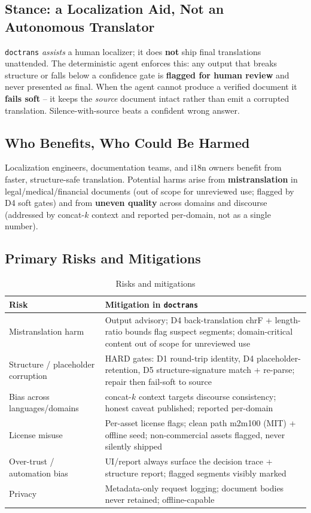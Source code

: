 \documentclass[12pt,a4paper]{article}
\begin{document}
\subsection{Stance: a Localization Aid, Not an Autonomous Translator}

\texttt{doctrans} \emph{assists} a human localizer; it does \textbf{not} ship final translations unattended. The deterministic agent enforces this: any output that breaks structure or falls below a confidence gate is \textbf{flagged for human review} and never presented as final. When the agent cannot produce a verified document it \textbf{fails soft} -- it keeps the \emph{source} document intact rather than emit a corrupted translation. Silence-with-source beats a confident wrong answer.

\subsection{Who Benefits, Who Could Be Harmed}

Localization engineers, documentation teams, and i18n owners benefit from faster, structure-safe translation. Potential harms arise from \textbf{mistranslation} in legal/medical/financial documents (out of scope for unreviewed use; flagged by D4 soft gates) and from \textbf{uneven quality} across domains and discourse (addressed by concat-$k$ context and reported per-domain, not as a single number).

\subsection{Primary Risks and Mitigations}

\begin{table}[H]
\centering
\caption{Risks and mitigations}
\small
\begin{tabularx}{\linewidth}{@{} L L @{}}
\toprule
\textbf{Risk} & \textbf{Mitigation in \texttt{doctrans}} \\
\midrule
Mistranslation harm & Output advisory; D4 back-translation chrF + length-ratio bounds flag suspect segments; domain-critical content out of scope for unreviewed use \\
Structure / placeholder corruption & HARD gates: D1 round-trip identity, D4 placeholder-retention, D5 structure-signature match + re-parse; repair then fail-soft to source \\
Bias across languages/domains & concat-$k$ context targets discourse consistency; honest caveat published; reported per-domain \\
License misuse & Per-asset license flags; clean path m2m100 (MIT) + offline seed; non-commercial assets flagged, never silently shipped \\
Over-trust / automation bias & UI/report always surface the decision trace + structure report; flagged segments visibly marked \\
Privacy & Metadata-only request logging; document bodies never retained; offline-capable \\
\bottomrule
\end{tabularx}
\end{table}
\end{document}
